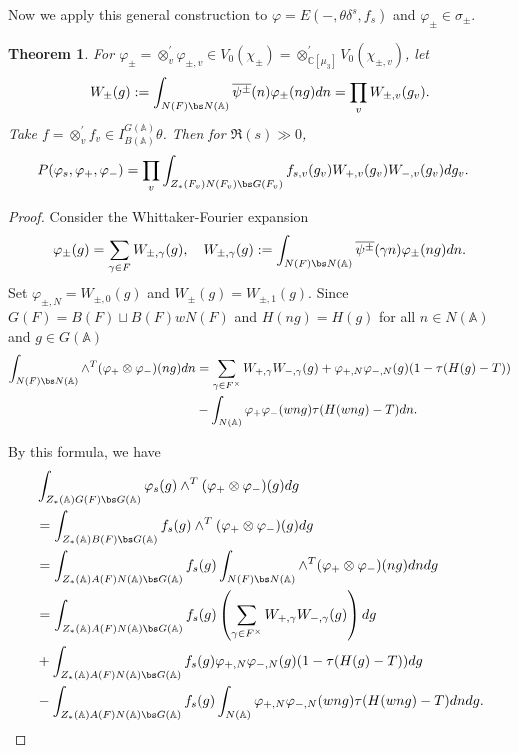 \documentclass[11pt,reqno]{amsart}
\newcommand{\BA}{{\mathbb {A}}} \newcommand{\BB}{{\mathbb {B}}}
\newcommand{\BC}{{\mathbb {C}}} \newcommand{\BD}{{\mathbb {D}}}
\theoremstyle{plain}
\newtheorem{thm}{Theorem}[section] \newtheorem{cor}[thm]{Corollary}
\theoremstyle{remark} \newtheorem{remark}[thm]{Remark}
\theoremstyle{definition} \newtheorem{exercise}[thm]{Exercise}
\theoremstyle{definition} \newtheorem{example}[thm]{Example} \newtheorem{condition}[thm]{Condition}
\numberwithin{equation}{section}
\renewcommand{\-}{\text{--}}
\begin{document}
Now we apply this general construction to $\varphi=E(-,\theta\delta^s,f_s)$ and $\varphi_\pm\in \sigma_\pm$.
\begin{thm}\label{co-period for Eisenstein family}For $\varphi_{\pm}=\otimes^\prime_v \varphi_{\pm,v}\in V_0(\chi_\pm)=\otimes_{\BC[\mu_3]}^\prime V_0(\chi_{\pm,v})$, let \[W_{\pm}(g):=\int_{N(F)\bs N(\BA)}\overline{\psi^{\pm}}(n)\varphi_{\pm}(ng)dn=\prod_v W_{\pm,v}(g_v).\] 
Take  $f=\otimes_v^\prime f_v\in I_{B(\BA)}^{G(\BA)}\theta$. Then for $\Re(s)\gg0$,
\begin{align*}P(\varphi_s,\varphi_+,\varphi_{-})&=\prod_{v}\int_{Z_*(F_v)N(F_v)\bs G(F_v)}f_{s,v}(g_v)W_{+,v}(g_v)W_{-,v}(g_v)dg_v.
\end{align*}
\end{thm}
\begin{proof}
Consider the Whittaker-Fourier expansion 
\[\varphi_{\pm}(g)=\sum_{\gamma\in F} W_{\pm,\gamma}(g),\quad W_{\pm,\gamma}(g):=\int_{N(F) \bs N(\BA)}\overline{\psi^{\pm}}(\gamma n)\varphi_{\pm}(ng)dn.\]
Set $\varphi_{\pm,N}=W_{\pm,0}(g)$ and $W_{\pm}(g)=W_{\pm,1}(g)$. Since $G(F)=B(F)\sqcup B(F)wN(F)$ and $H(ng)=H(g)$ for all $n\in N(\BA)$ and $g\in G(\BA)$
\begin{align*}
\int_{N(F)\bs N(\BA)}\wedge^T(\varphi_{+}\otimes\varphi_{-})(ng)dn&=\sum_{\gamma\in F^\times}W_{+,\gamma} W_{-,\gamma}(g)+\varphi_{+,N}\varphi_{-,N}(g)(1-\tau(H(g)-T))\\
&-\int_{N(\BA)}\varphi_+\varphi_-(wng)\tau(H(wng)-T)dn.
\end{align*}

By this formula, we have
\begin{align*}
&\int_{Z_*(\BA)G(F)\bs G(\BA)} \varphi_s(g)\wedge^T(\varphi_{+}\otimes\varphi_{-})(g)dg\\
&=\int_{Z_*(\BA)B(F)\bs G(\BA)}f_s(g)\wedge^T(\varphi_{+}\otimes\varphi_{-})(g)dg\\
&=\int_{Z_*(\BA)A(F)N(\BA)\bs G(\BA)}f_s(g)\int_{N(F)\bs N(\BA)}\wedge^T(\varphi_{+}\otimes\varphi_{-})(ng)dn dg\\
&=\int_{Z_*(\BA)A(F)N(\BA)\bs G(\BA)}f_s(g)\left(\sum_{\gamma\in F^\times}W_{+,\gamma}W_{-,\gamma}(g)\right) dg\\
&+\int_{Z_*(\BA)A(F)N(\BA)\bs G(\BA)}f_s(g)\varphi_{+,N}\varphi_{-,N}(g)(1-\tau(H(g)-T))dg\\
&-\int_{Z_*(\BA)A(F)N(\BA)\bs G(\BA)}f_s(g)\int_{N(\BA)}\varphi_{+,N}\varphi_{-,N}(wng)\tau(H(wng)-T)dndg.\\
\end{align*}


\end{proof}
\end{document}

